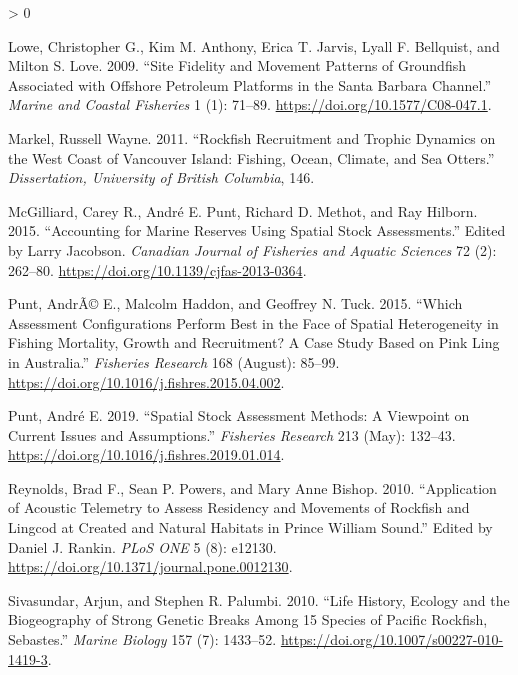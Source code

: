 \documentclass[11pt,
  english,
  a4paper,
]{article}
\newlength{\cslhangindent}
\newenvironment{CSLReferences}[2] %
 {%
  \setlength{\parindent}{0pt}
  \ifodd #1 \everypar{\setlength{\hangindent}{\cslhangindent}}\ignorespaces\fi
  \ifnum #2 > 0
  \setlength{\parskip}{#2\baselineskip}
  \fi
 }%
 {}
\begin{document}
\begin{CSLReferences}{1}{0}
\leavevmode\hypertarget{ref-lowe_site_2009}{}%
Lowe, Christopher G., Kim M. Anthony, Erica T. Jarvis, Lyall F. Bellquist, and Milton S. Love. 2009. {``Site {Fidelity} and {Movement} {Patterns} of {Groundfish} {Associated} with {Offshore} {Petroleum} {Platforms} in the {Santa} {Barbara} {Channel}.''} \emph{Marine and Coastal Fisheries} 1 (1): 71--89. \url{https://doi.org/10.1577/C08-047.1}.

\leavevmode\hypertarget{ref-markel_rockfish_2011}{}%
Markel, Russell Wayne. 2011. {``Rockfish Recruitment and Trophic Dynamics on the West Coast of Vancouver Island: Fishing, Ocean, Climate, and Sea Otters.''} \emph{Dissertation, University of British Columbia}, 146.

\leavevmode\hypertarget{ref-mcgilliard_accounting_2015}{}%
McGilliard, Carey R., André E. Punt, Richard D. Methot, and Ray Hilborn. 2015. {``Accounting for Marine Reserves Using Spatial Stock Assessments.''} Edited by Larry Jacobson. \emph{Canadian Journal of Fisheries and Aquatic Sciences} 72 (2): 262--80. \url{https://doi.org/10.1139/cjfas-2013-0364}.

\leavevmode\hypertarget{ref-punt_which_2015}{}%
Punt, AndrÃ© E., Malcolm Haddon, and Geoffrey N. Tuck. 2015. {``Which Assessment Configurations Perform Best in the Face of Spatial Heterogeneity in Fishing Mortality, Growth and Recruitment? {A} Case Study Based on Pink Ling in {Australia}.''} \emph{Fisheries Research} 168 (August): 85--99. \url{https://doi.org/10.1016/j.fishres.2015.04.002}.

\leavevmode\hypertarget{ref-punt_spatial_2019}{}%
Punt, André E. 2019. {``Spatial Stock Assessment Methods: {A} Viewpoint on Current Issues and Assumptions.''} \emph{Fisheries Research} 213 (May): 132--43. \url{https://doi.org/10.1016/j.fishres.2019.01.014}.

\leavevmode\hypertarget{ref-reynolds_application_2010}{}%
Reynolds, Brad F., Sean P. Powers, and Mary Anne Bishop. 2010. {``Application of {Acoustic} {Telemetry} to {Assess} {Residency} and {Movements} of {Rockfish} and {Lingcod} at {Created} and {Natural} {Habitats} in {Prince} {William} {Sound}.''} Edited by Daniel J. Rankin. \emph{PLoS ONE} 5 (8): e12130. \url{https://doi.org/10.1371/journal.pone.0012130}.

\leavevmode\hypertarget{ref-sivasundar_life_2010}{}%
Sivasundar, Arjun, and Stephen R. Palumbi. 2010. {``Life History, Ecology and the Biogeography of Strong Genetic Breaks Among 15 Species of {Pacific} Rockfish, {Sebastes}.''} \emph{Marine Biology} 157 (7): 1433--52. \url{https://doi.org/10.1007/s00227-010-1419-3}.


\end{CSLReferences}
\end{document}
